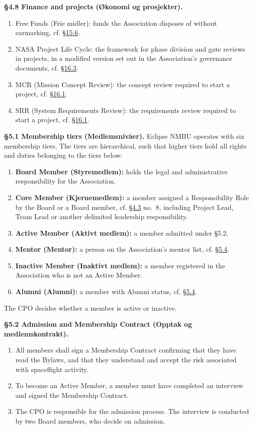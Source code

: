 \documentclass{../../../Common/Latex/Templates/rapport}
\begin{document}
\textbf{\S 4.8 Finance and projects (Økonomi og prosjekter).}\label{bylaw:4.8}
\begin{enumerate}
  \item Free Funds (Frie midler): funds the Association disposes of without earmarking, cf. \hyperref[bylaw:15.6]{\S 15.6}.
  \item NASA Project Life Cycle: the framework for phase division and gate reviews in projects, in a modified version set out in the Association's governance documents, cf. \hyperref[bylaw:16.3]{\S 16.3}.
  \item MCR (Mission Concept Review): the concept review required to start a project, cf. \hyperref[bylaw:16.1]{\S 16.1}.
  \item SRR (System Requirements Review): the requirements review required to start a project, cf. \hyperref[bylaw:16.1]{\S 16.1}.
\end{enumerate}


\label{bylaw:5}
\textbf{\S 5.1 Membership tiers (Medlemsnivåer).}\label{bylaw:5.1} Eclipse NMBU operates with six membership tiers. The tiers are hierarchical, such that higher tiers hold all rights and duties belonging to the tiers below:
\begin{enumerate}
  \item \textbf{Board Member (Styremedlem):} holds the legal and administrative responsibility for the Association.
  \item \textbf{Core Member (Kjernemedlem):} a member assigned a Responsibility Role by the Board or a Board member, cf. \hyperref[bylaw:4.3]{\S 4.3} no.\ 8, including Project Lead, Team Lead or another delimited leadership responsibility.
  \item \textbf{Active Member (Aktivt medlem):} a member admitted under \S5.2.
  \item \textbf{Mentor (Mentor):} a person on the Association's mentor list, cf. \hyperref[bylaw:5.4]{\S 5.4}.
  \item \textbf{Inactive Member (Inaktivt medlem):} a member registered in the Association who is not an Active Member.
  \item \textbf{Alumni (Alumni):} a member with Alumni status, cf. \hyperref[bylaw:5.4]{\S 5.4}.
\end{enumerate}
The CPO decides whether a member is active or inactive.

\textbf{\S 5.2 Admission and Membership Contract (Opptak og medlemskontrakt).}\label{bylaw:5.2}
\begin{enumerate}
  \item All members shall sign a Membership Contract confirming that they have read the Bylaws, and that they understand and accept the risk associated with spaceflight activity.
  \item To become an Active Member, a member must have completed an interview and signed the Membership Contract.
  \item The CPO is responsible for the admission process. The interview is conducted by two Board members, who decide on admission.
\end{enumerate}
\end{document}
